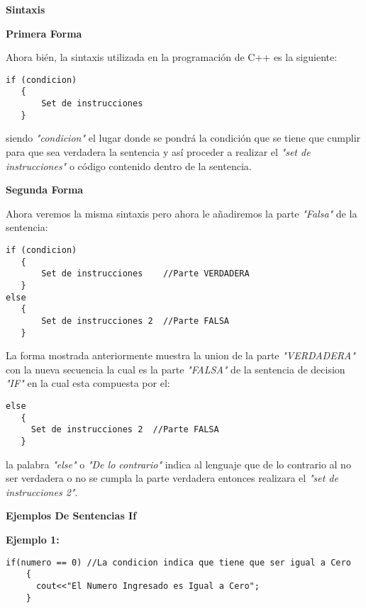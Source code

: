 \begin{center}
	\textbf{Sintaxis}
\end{center}

\textbf{Primera Forma}

Ahora bién, la sintaxis utilizada en la programación de C++ es la siguiente:

\begin{lstlisting}[style=Cpp, label=sintaxis-if, caption=Sintaxis If]
if (condicion)
   {
       Set de instrucciones
   }
\end{lstlisting}

siendo \textit{"condicion"} el lugar donde se pondrá la condición que se tiene que cumplir para que sea verdadera la sentencia y así proceder a realizar el \textit{"set de instrucciones"} o código contenido dentro de la sentencia.

\textbf{Segunda Forma}

Ahora veremos la misma sintaxis pero ahora le añadiremos la parte \textit{"Falsa"} de la sentencia:

\begin{lstlisting}[style=Cpp, label=sintaxis-if-else, caption=Sintaxis If Else]
if (condicion)
   {
       Set de instrucciones    //Parte VERDADERA
   }
else
   {
       Set de instrucciones 2  //Parte FALSA
   }
\end{lstlisting}

La forma mostrada anteriormente muestra la union de la parte \textit{"VERDADERA"} con la nueva secuencia la cual es la parte \textit{"FALSA"} de la sentencia de decision \textit{"IF"} en la cual esta compuesta por el:

\begin{lstlisting}[style=Cpp, label=sintaxis-else, caption=Sintaxis Else]
else
   {
     Set de instrucciones 2  //Parte FALSA
   }
\end{lstlisting}

la palabra \textit{"else"} o \textit{"De lo contrario"} indica al lenguaje que de lo contrario al no ser verdadera o no se cumpla la parte verdadera entonces realizara el \textit{"set de instrucciones 2"}.

\begin{center}
	\textbf{Ejemplos De Sentencias If}
\end{center}

\textbf{Ejemplo 1:}

\begin{lstlisting}[style=Cpp, label=if-ejemplo-1, caption=If Ejemplo 1]
if(numero == 0) //La condicion indica que tiene que ser igual a Cero
    {
      cout<<"El Numero Ingresado es Igual a Cero";
    }
\end{lstlisting}

